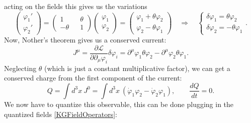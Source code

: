 acting on the fields this gives us the variations
\begin{equation*}
    \begin{pmatrix}
        \varphi_1'\\\varphi_2'
    \end{pmatrix}=\begin{pmatrix}
        1&&\theta\\-\theta&&1
    \end{pmatrix}\begin{pmatrix}
        \varphi_1\\\varphi_2
    \end{pmatrix}=\begin{pmatrix}
        \varphi_1+\theta\varphi_2\\\varphi_2-\theta\varphi_1
    \end{pmatrix}\quad\Rightarrow\quad\begin{cases}
        \delta\varphi_1=\theta\varphi_2\\
        \delta\varphi_2=-\theta\varphi_1
    \end{cases}.
\end{equation*}
Now, Nother's theorem gives us a conserved current:
\begin{equation*}
    J^\mu=\frac{\partial\mathcal{L} }{\partial\partial_\mu \varphi_i}\delta\varphi_i=\partial^\mu\varphi_1\theta\varphi_2-\partial^\mu\varphi_2\theta\varphi_1.
\end{equation*}
Neglecting $\theta$ (which is just a constant multiplicative factor), we can get a conserved charge from the first component of the current:
\begin{equation*}
    Q=\int d^3x\ J^0=\int d^3x\ (\dot\varphi_1\varphi_2-\dot\varphi_2\varphi_1),\qquad\frac{dQ}{dt}=0.
\end{equation*}
We now have to quantize this observable, this can be done plugging in the quantized fields \eqref{KGFieldOperators}:
